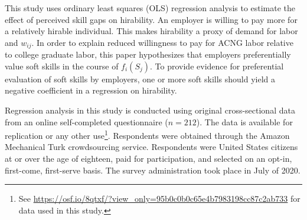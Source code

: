 \documentclass[review]{elsarticle}
\begin{document}
This study uses ordinary least squares (OLS) regression analysis to estimate the effect of perceived skill gaps on hirability.
An employer is willing to pay more for a relatively hirable individual.
This makes hirability a proxy of demand for labor and $w_{ij}$.
%
In order to explain reduced willingness to pay for ACNG labor relative to college graduate labor,
this paper hypothesizes that employers preferentially value soft skills in the course of $f_i(S_j)$.
To provide evidence for preferential evaluation of soft skills by employers,
one or more soft skills should yield a negative coefficient
in a regression on hirability.


Regression analysis in this study is conducted using original cross-sectional data from an online self-completed questionnaire ($n = 212$).
The data is available for replication or any other use\footnote{
    See \url{https://osf.io/8qtxf/?view_only=95b0c0b0c65e4b7983198cc87c2ab733}
    for data used in this study.
}.
Respondents were obtained through the Amazon Mechanical Turk crowdsourcing service.
Respondents were United States citizens at or over the age of eighteen,
paid for participation,
and selected on an opt-in, first-come, first-serve basis.
The survey administration took place in July of 2020.
\end{document}
